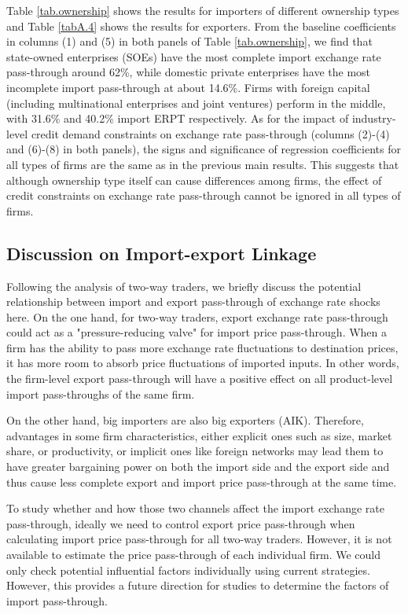 \documentclass[12pt]{article}
\begin{document}
Table \ref{tab.ownership} shows the results for importers of different ownership types and Table \ref{tabA.4} shows the results for exporters. From the baseline coefficients in columns (1) and (5) in both panels of Table \ref{tab.ownership}, we find that state-owned enterprises (SOEs) have the most complete import exchange rate pass-through around 62\%, while domestic private enterprises have the most incomplete import pass-through at about 14.6\%. Firms with foreign capital (including multinational enterprises and joint ventures) perform in the middle, with 31.6\% and 40.2\% import ERPT respectively. As for the impact of industry-level credit demand constraints on exchange rate pass-through (columns (2)-(4) and (6)-(8) in both panels), the signs and significance of regression coefficients for all types of firms are the same as in the previous main results. This suggests that although ownership type itself can cause differences among firms, the effect of credit constraints on exchange rate pass-through cannot be ignored in all types of firms.

\subsection{Discussion on Import-export Linkage}

Following the analysis of two-way traders, we briefly discuss the potential relationship between import and export pass-through of exchange rate shocks here. On the one hand, for two-way traders, export exchange rate pass-through could act as a "pressure-reducing valve" for import price pass-through. When a firm has the ability to pass more exchange rate fluctuations to destination prices, it has more room to absorb price fluctuations of imported inputs. In other words, the firm-level export pass-through will have a positive effect on all product-level import pass-throughs of the same firm.

On the other hand, big importers are also big exporters (AIK\cite{aik2014}). Therefore, advantages in some firm characteristics, either explicit ones such as size, market share, or productivity, or implicit ones like foreign networks may lead them to have greater bargaining power on both the import side and the export side and thus cause less complete export and import price pass-through at the same time. 

To study whether and how those two channels affect the import exchange rate pass-through, ideally we need to control export price pass-through when calculating import price pass-through for all two-way traders. However, it is not available to estimate the price pass-through of each individual firm. We could only check potential influential factors individually using current strategies. However, this provides a future direction for studies to determine the factors of import pass-through.
\end{document}

